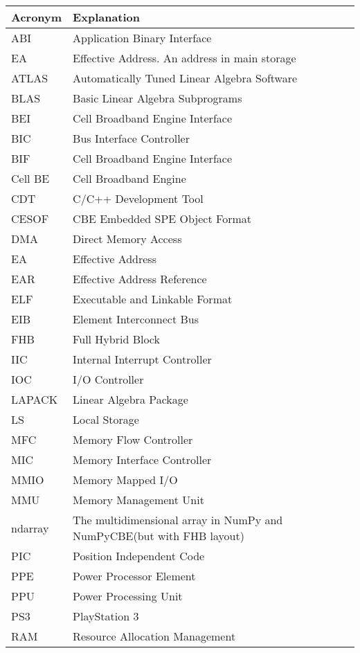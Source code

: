 \begin{center}
\begin{tabular}{ll}
\bf{Acronym} & \bf{Explanation} \\
\hline
\hline
ABI     & Application Binary Interface \\
EA      & Effective Address. An address in main storage \\
ATLAS   & Automatically Tuned Linear Algebra Software \\
BLAS    & Basic Linear Algebra Subprograms \\
BEI     & Cell Broadband Engine Interface \\
BIC     & Bus Interface Controller \\
BIF     & Cell Broadband Engine Interface \\
Cell BE & Cell Broadband Engine \\
CDT     & C/C++ Development Tool \\
CESOF   & CBE Embedded SPE Object Format \\
DMA     & Direct Memory Access \\
EA      & Effective Address \\
EAR     & Effective Address Reference \\
ELF     & Executable and Linkable Format \\
EIB     & Element Interconnect Bus \\
FHB     & Full Hybrid Block \\
IIC     & Internal Interrupt Controller \\
IOC     & I/O Controller \\
LAPACK  & Linear Algebra Package \\
LS      & Local Storage \\
MFC     & Memory Flow Controller \\
MIC     & Memory Interface Controller \\
MMIO    & Memory Mapped I/O \\
MMU     & Memory Management Unit \\
ndarray & The multidimensional array in NumPy and NumPyCBE(but with FHB layout) \\
PIC     & Position Independent Code \\
PPE     & Power Processor Element \\
PPU     & Power Processing Unit \\
PS3     & PlayStation 3 \\
RAM     & Resource Allocation Management \\

\end{tabular}
\end{center}
